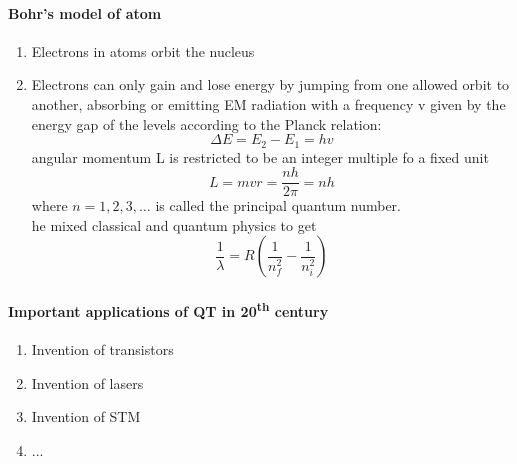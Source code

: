 \documentclass[12pt, a4paper]{article}
\begin{document}
\paragraph{Bohr's model of atom}
\begin{enumerate}
\item Electrons in atoms orbit the nucleus
\item Electrons can only gain and lose energy by jumping from one allowed orbit to another, absorbing or emitting EM radiation with a frequency v given by the energy gap of the levels according to the Planck relation: $$\Delta E = E_2-E_1=hv$$
angular momentum L is restricted to be an integer multiple fo a fixed unit $$L=mvr=\frac{nh}{2\pi}=nh$$ where $n=1,2,3, \hdots$ is called the principal quantum number.\\
he mixed classical and quantum physics to get $$\frac{1}{\lambda}=R\left(\frac{1}{n_f^2}-\frac{1}{n_i^2}\right)$$
\end{enumerate}
\paragraph{Important applications of QT in 20\textsuperscript{th} century}
\begin{enumerate}
\item Invention of transistors
\item Invention of lasers
\item Invention of STM
\item ...
\end{enumerate}
\end{document}
